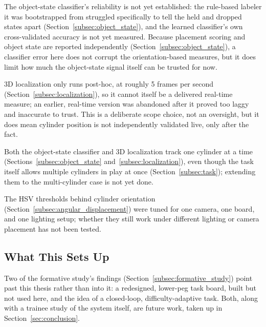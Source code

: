 The object-state classifier's reliability is not yet established: the
rule-based labeler it was bootstrapped from struggled specifically to
tell the held and dropped states apart
(Section~\ref{subsec:object_state}), and the learned classifier's own
cross-validated accuracy is not yet measured. Because placement
scoring and object state are reported independently
(Section~\ref{subsec:object_state}), a classifier error here does not
corrupt the orientation-based measures, but it does limit how much the
object-state signal itself can be trusted for now.

3D localization only runs post-hoc, at roughly 5 frames per second
(Section~\ref{subsec:localization}), so it cannot itself be a
delivered real-time measure; an earlier, real-time version was
abandoned after it proved too laggy and inaccurate to trust. This is
a deliberate scope choice, not an oversight, but it does mean cylinder
position is not independently validated live, only after the fact.

Both the object-state classifier and 3D localization track one
cylinder at a time (Sections~\ref{subsec:object_state}
and~\ref{subsec:localization}), even though the task itself allows
multiple cylinders in play at once (Section~\ref{subsec:task});
extending them to the multi-cylinder case is not yet done.

The HSV thresholds behind cylinder orientation
(Section~\ref{subsec:angular_displacement}) were tuned for one
camera, one board, and one lighting setup; whether they still work
under different lighting or camera placement has not been tested.

\subsection{What This Sets Up}

Two of the formative study's findings
(Section~\ref{subsec:formative_study}) point past this thesis rather
than into it: a redesigned, lower-peg task board, built but not used
here, and the idea of a closed-loop, difficulty-adaptive task. Both,
along with a trainee study of the system itself, are future work,
taken up in Section~\ref{sec:conclusion}.

